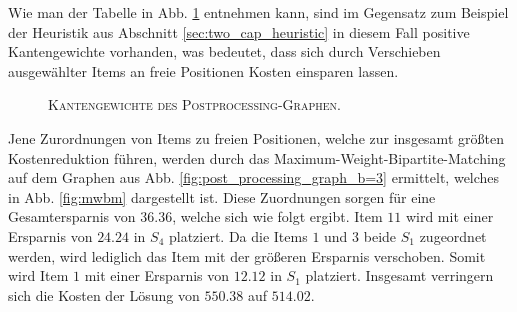 Wie man der Tabelle in Abb. \ref{fig:post_processing_costs} entnehmen kann, sind im Gegensatz zum Beispiel
der Heuristik aus Abschnitt \ref{sec:two_cap_heuristic} in diesem Fall positive Kantengewichte vorhanden,
was bedeutet, dass sich durch Verschieben ausgewählter Items an freie Positionen Kosten einsparen lassen.

\begin{figure}[H]
\centering
{}
\caption{\textsc{Kantengewichte des Postprocessing-Graphen}.}
\label{fig:post_processing_costs}
\end{figure}

Jene Zurordnungen von Items zu freien Positionen, welche zur insgesamt größten Kostenreduktion führen, werden durch
das Maximum-Weight-Bipartite-Matching auf dem Graphen aus Abb. \ref{fig:post_processing_graph_b=3} ermittelt,
welches in Abb. \ref{fig:mwbm} dargestellt ist.
Diese Zuordnungen sorgen für eine Gesamtersparnis von $36.36$, welche sich wie folgt ergibt.
Item $11$ wird mit einer Ersparnis von $24.24$ in $S_4$ platziert. Da die Items $1$ und $3$ beide $S_1$ zugeordnet werden,
wird lediglich das Item mit der größeren Ersparnis verschoben. Somit wird Item $1$ mit einer Ersparnis von $12.12$
in $S_1$ platziert. Insgesamt verringern sich die Kosten der Lösung von $550.38$ auf $514.02$.

